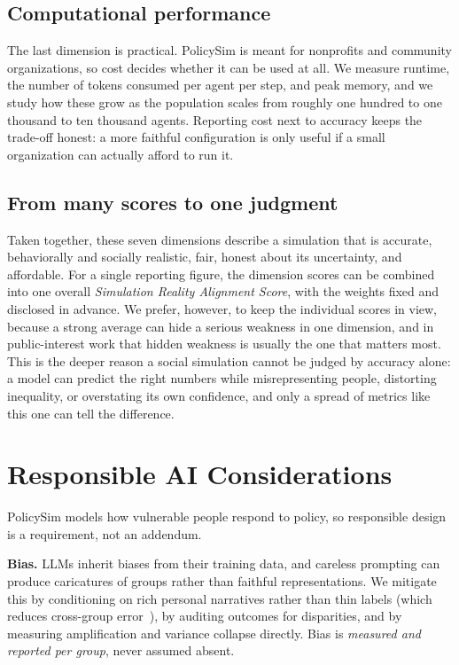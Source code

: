 \documentclass[conference]{IEEEtran}
\begin{document}
\subsection{Computational performance}
The last dimension is practical. PolicySim is meant for nonprofits and community organizations, so cost decides whether it can be used at all. We measure runtime, the number of tokens consumed per agent per step, and peak memory, and we study how these grow as the population scales from roughly one hundred to one thousand to ten thousand agents. Reporting cost next to accuracy keeps the trade-off honest: a more faithful configuration is only useful if a small organization can actually afford to run it.

\subsection{From many scores to one judgment}
Taken together, these seven dimensions describe a simulation that is accurate, behaviorally and socially realistic, fair, honest about its uncertainty, and affordable. For a single reporting figure, the dimension scores can be combined into one overall \emph{Simulation Reality Alignment Score}, with the weights fixed and disclosed in advance. We prefer, however, to keep the individual scores in view, because a strong average can hide a serious weakness in one dimension, and in public-interest work that hidden weakness is usually the one that matters most. This is the deeper reason a social simulation cannot be judged by accuracy alone: a model can predict the right numbers while misrepresenting people, distorting inequality, or overstating its own confidence, and only a spread of metrics like this one can tell the difference.

\section{Responsible AI Considerations}
\label{sec:resp}

PolicySim models how vulnerable people respond to policy, so responsible design is a requirement, not an addendum.

\textbf{Bias.} LLMs inherit biases from their training data, and careless prompting can produce caricatures of groups rather than faithful representations. We mitigate this by conditioning on rich personal narratives rather than thin labels (which reduces cross-group error~\cite{park2024}), by auditing outcomes for disparities, and by measuring amplification and variance collapse directly. Bias is \emph{measured and reported per group}, never assumed absent.
\end{document}
